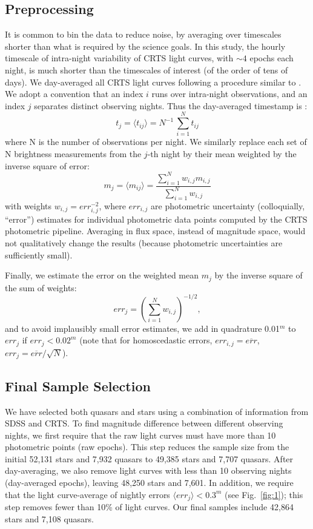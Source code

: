 \documentclass[fleqn,usenatbib]{mnras}  %
\begin{document}
\subsection{Preprocessing}
\label{sec:preprocessing}
It is common to bin the data to reduce noise, by averaging over timescales shorter than what is required by the science goals. In this study, the hourly timescale of intra-night variability of CRTS light curves, with $\sim4$ epochs each night, is much shorter than the timescales of interest (of the order of tens of days).  We day-averaged all CRTS light curves following a procedure similar to \cite{charisi2016}. We adopt a convention that an index  $i$ runs over intra-night observations, and an index $j$ separates distinct observing nights. Thus the day-averaged timestamp is : 
\begin{equation}
t_{j} = \langle t_{ij} \rangle =  N^{-1} \, \sum_{i=1}^{N}{ t_{ij} }
\end{equation}
where N is the number of observations per night. We similarly replace each set of N brightness measurements from the  $j$-th  night by their mean weighted by the inverse square of error:
\begin{equation}
\label{eq:1}
 m_{j} = \langle m_{ij} \rangle = \frac{\sum_{i=1}^{N} {w_{i,j} m_{i,j}} } {\sum_{i=1}^{N} {w_{i,j}} }
\end{equation}
with weights $w_{i,j} = err_{i,j}^{-2}$, where $err_{i,j}$ are photometric uncertainty (colloquially, ``error'') estimates
for individual photometric data points computed by the CRTS photometric pipeline. Averaging in 
flux space, instead of magnitude space, would not qualitatively change the results (because photometric 
uncertainties are sufficiently small). 

Finally, we estimate the error on the weighted mean $m_{j}$ by the inverse square of the sum of weights:  
\begin{equation}
\label{eq:2}
err_{j} = \left(\sum_{i=1}^{N} {w_{i,j}}\right)^{-1/2}, 
\end{equation} 
and to avoid implausibly small error estimates, we add in quadrature 0.01$^m$ to $err_{j}$ if $err_{j} < 0.02^m$
(note that for homoscedastic errors, $err_{i,j}=\overline{err}$, $err_j = \overline{err}/\sqrt{N}$). 


\subsection{Final Sample Selection}

We have selected both quasars and stars using a combination of information from SDSS and CRTS. 
To find magnitude difference between different observing nights, we first require that the raw light curves
must have more than 10 photometric points (raw epochs). This step reduces the sample size from the initial 52,131 stars and 7,932 
quasars to 49,385 stars and 7,707 quasars. After day-averaging, we also remove light curves with less than 10 
observing nights (day-averaged epochs), leaving 48,250 stars and 7,601. In addition, we require that the light curve-average 
of nightly errors $\langle err_{j} \rangle < 0.3^m$ (see Fig.~\ref{fig:1}); this step removes
fewer than 10\% of light curves. Our final samples include 42,864 stars and 7,108 quasars. 
\end{document}

